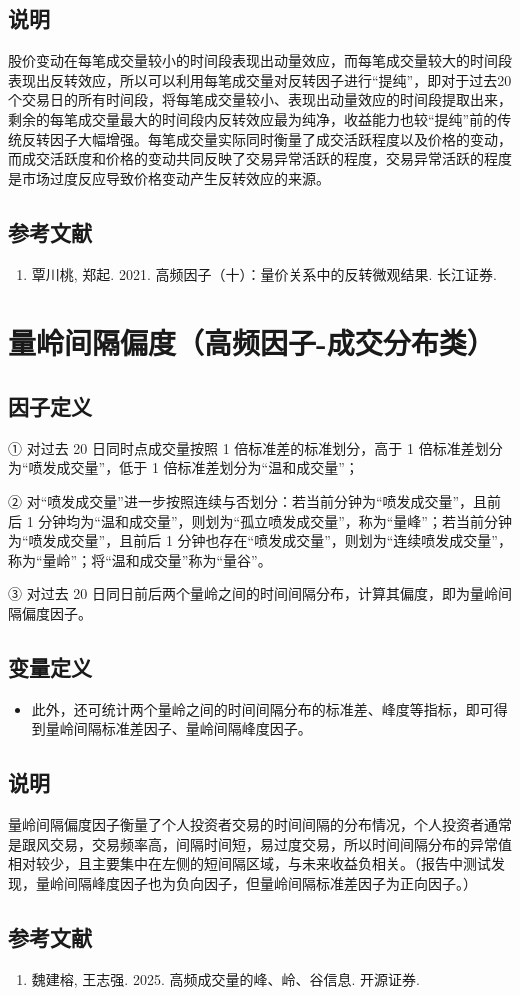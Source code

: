\documentclass{article}
\begin{document}
\subsection{说明}
股价变动在每笔成交量较小的时间段表现出动量效应，而每笔成交量较大的时间段表现出反转效应，所以可以利用每笔成交量对反转因子进行“提纯”，即对于过去20个交易日的所有时间段，将每笔成交量较小、表现出动量效应的时间段提取出来，剩余的每笔成交量最大的时间段内反转效应最为纯净，收益能力也较“提纯”前的传统反转因子大幅增强。每笔成交量实际同时衡量了成交活跃程度以及价格的变动，而成交活跃度和价格的变动共同反映了交易异常活跃的程度，交易异常活跃的程度是市场过度反应导致价格变动产生反转效应的来源。

\subsection{参考文献}
\begin{enumerate}
    \item 覃川桃, 郑起. 2021. 高频因子（十）：量价关系中的反转微观结果. 长江证券.
\end{enumerate}

\section{量岭间隔偏度（高频因子-成交分布类）}

\subsection{因子定义}


① 对过去 20 日同时点成交量按照 1 倍标准差的标准划分，高于 1 倍标准差划分为“喷发成交量”，低于 1 倍标准差划分为“温和成交量”；

② 对“喷发成交量”进一步按照连续与否划分：若当前分钟为“喷发成交量”，且前后 1 分钟均为“温和成交量”，则划为“孤立喷发成交量”，称为“量峰”；若当前分钟为“喷发成交量”，且前后 1 分钟也存在“喷发成交量”，则划为“连续喷发成交量”，称为“量岭”；将“温和成交量”称为“量谷”。

③ 对过去 20 日同日前后两个量岭之间的时间间隔分布，计算其偏度，即为量岭间隔偏度因子。

\subsection{变量定义}
\begin{itemize}
    \item 此外，还可统计两个量岭之间的时间间隔分布的标准差、峰度等指标，即可得到量岭间隔标准差因子、量岭间隔峰度因子。
\end{itemize}

\subsection{说明}
量岭间隔偏度因子衡量了个人投资者交易的时间间隔的分布情况，个人投资者通常是跟风交易，交易频率高，间隔时间短，易过度交易，所以时间间隔分布的异常值相对较少，且主要集中在左侧的短间隔区域，与未来收益负相关。（报告中测试发现，量岭间隔峰度因子也为负向因子，但量岭间隔标准差因子为正向因子。）

\subsection{参考文献}
\begin{enumerate}
    \item 魏建榕, 王志强. 2025. 高频成交量的峰、岭、谷信息. 开源证券.
\end{enumerate}
\end{document}
